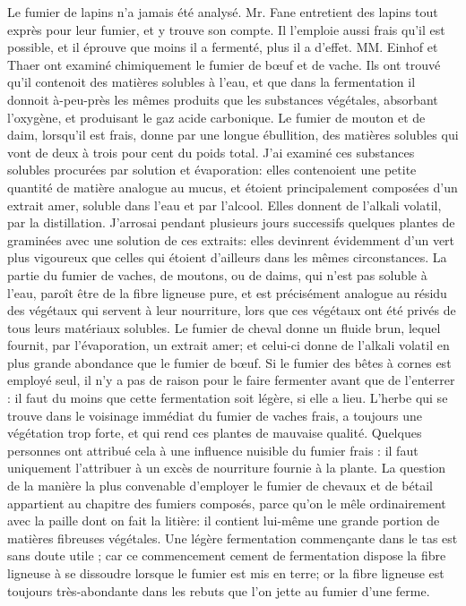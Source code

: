 Le fumier de lapins n'a jamais été analysé. Mr. Fane entretient des lapins tout exprès pour leur fumier, et y trouve son compte. Il l'emploie aussi frais qu'il est possible, et il éprouve que moins il a fermenté, plus il a d'effet.\setcounter{page}{200} MM. Einhof et Thaer ont examiné chimiquement le fumier de bœuf et de vache. Ils ont trouvé qu'il contenoit des matières solubles à l'eau, et que dans la fermentation il donnoit à-peu-près les mêmes produits que les substances végétales, absorbant l'oxygène, et produisant le gaz acide carbonique.
Le fumier de mouton et de daim, lorsqu'il est frais, donne par une longue ébullition, des matières solubles qui vont de deux à trois pour cent du poids total. J'ai examiné ces substances solubles procurées par solution et évaporation: elles contenoient une petite quantité de matière analogue au mucus, et étoient principalement composées d'un extrait amer, soluble dans l'eau et par l'alcool. Elles donnent de l'alkali volatil, par la distillation. J'arrosai pendant plusieurs jours successifs quelques plantes de graminées avec une solution de ces extraits: elles devinrent évidemment d'un vert plus vigoureux que celles qui étoient d'ailleurs dans les mêmes circonstances.
La partie du fumier de vaches, de moutons, ou de daims, qui n'est pas soluble à l'eau, paroît être de la fibre ligneuse pure, et est précisément analogue au résidu des\setcounter{page}{201} végétaux qui servent à leur nourriture, lors que ces végétaux ont été privés de tous leurs matériaux solubles.
Le fumier de cheval donne un fluide brun, lequel fournit, par l'évaporation, un extrait amer; et celui-ci donne de l'alkali volatil en plus grande abondance que le fumier de bœuf.
Si le fumier des bêtes à cornes est employé seul, il n'y a pas de raison pour le faire fermenter avant que de l'enterrer : il faut du moins que cette fermentation soit légère, si elle a lieu. L'herbe qui se trouve dans le voisinage immédiat du fumier de vaches frais, a toujours une végétation trop forte, et qui rend ces plantes de mauvaise qualité. Quelques personnes ont attribué cela à une influence nuisible du fumier frais : il faut uniquement l'attribuer à un excès de nourriture fournie à la plante.
La question de la manière la plus convenable d'employer le fumier de chevaux et de bétail appartient au chapitre des fumiers composés, parce qu'on le mêle ordinairement avec la paille dont on fait la litière: il contient lui-même une grande portion de matières fibreuses végétales.
Une légère fermentation commençante dans le tas est sans doute utile ; car ce commencement\setcounter{page}{202} cement de fermentation dispose la fibre ligneuse à se dissoudre lorsque le fumier est mis en terre; or la fibre ligneuse est toujours très-abondante dans les rebuts que l'on jette au fumier d'une ferme.
